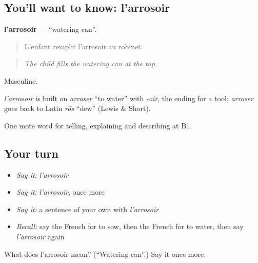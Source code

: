 \subsection*{You'll want to know: l'arrosoir}
\textbf{l'arrosoir} — \textquotedblleft{}watering can\textquotedblright{}.

\begin{quote}
L'enfant remplit l'arrosoir au robinet.
\end{quote}

\begin{quote}
\emph{The child fills the watering can at the tap.}
\end{quote}

Masculine.

\begin{cousinweb}
\emph{l'arrosoir} is built on \emph{arroser} \textquotedblleft{}to water\textquotedblright{} with \emph{-oir}, the ending for a tool; \emph{arroser} goes back to Latin \emph{rōs} \textquotedblleft{}dew\textquotedblright{} (Lewis \& Short).
\end{cousinweb}

\begin{grammarlens}[title={What you've built}]
One more word for telling, explaining and describing at B1.
\end{grammarlens}

\subsection*{Your turn}
\begin{itemize}
\raggedright
  \item \emph{Say it:} \emph{l'arrosoir}
  \item \emph{Say it:} \emph{l'arrosoir}, once more
  \item \emph{Say it:} a sentence of your own with \emph{l'arrosoir}
  \item \emph{Recall:} say the French for to sow, then the French for to water, then say \emph{l'arrosoir} again
\end{itemize}

\begin{tcolorbox}[breakable,colback=teal!4,colframe=teal!35!black,title={Before you move on}]
What does l'arrosoir mean? (\textquotedblleft{}Watering can\textquotedblright{}.) Say it once more.
\end{tcolorbox}
